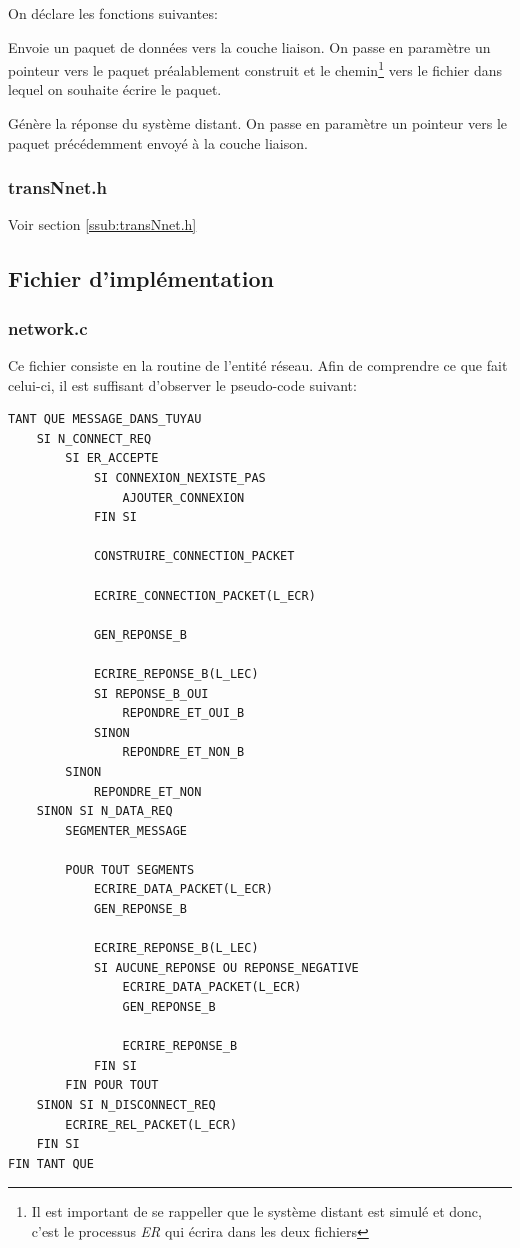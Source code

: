 \documentclass[11pt,french]{article}
\begin{document}
                On déclare les fonctions suivantes:
                
                Envoie un paquet de données vers la couche liaison. On passe en paramètre un pointeur vers le paquet préalablement construit et le chemin\footnote{Il est important de se rappeller que le système distant est
                simulé et donc, c'est le processus \emph{ER} qui écrira dans les deux fichiers} vers le fichier dans lequel on souhaite écrire le paquet.
                
                Génère la réponse du système distant. On passe en paramètre un pointeur vers le paquet précédemment envoyé à la couche liaison.
            \subsubsection{transNnet.h} %
            \label{ssub:transNnet.h-net}
                Voir section {\color{blue} \ref{ssub:transNnet.h}}
        \subsection{Fichier d'implémentation} %
        \label{sub:fich-implementation-network-entity}
            \subsubsection{network.c} %
            \label{ssub:network.c}
                Ce fichier consiste en la routine de l'entité réseau. Afin de comprendre ce que fait celui-ci, il est suffisant d'observer le pseudo-code suivant:
\begin{lstlisting}
TANT QUE MESSAGE_DANS_TUYAU
    SI N_CONNECT_REQ
        SI ER_ACCEPTE
            SI CONNEXION_NEXISTE_PAS
                AJOUTER_CONNEXION
            FIN SI

            CONSTRUIRE_CONNECTION_PACKET

            ECRIRE_CONNECTION_PACKET(L_ECR)

            GEN_REPONSE_B

            ECRIRE_REPONSE_B(L_LEC)
            SI REPONSE_B_OUI
                REPONDRE_ET_OUI_B
            SINON
                REPONDRE_ET_NON_B
        SINON
            REPONDRE_ET_NON
    SINON SI N_DATA_REQ
        SEGMENTER_MESSAGE
        
        POUR TOUT SEGMENTS
            ECRIRE_DATA_PACKET(L_ECR)
            GEN_REPONSE_B
            
            ECRIRE_REPONSE_B(L_LEC)
            SI AUCUNE_REPONSE OU REPONSE_NEGATIVE
                ECRIRE_DATA_PACKET(L_ECR)
                GEN_REPONSE_B
                
                ECRIRE_REPONSE_B
            FIN SI
        FIN POUR TOUT
    SINON SI N_DISCONNECT_REQ
        ECRIRE_REL_PACKET(L_ECR)
    FIN SI
FIN TANT QUE
\end{lstlisting}
\end{document}
